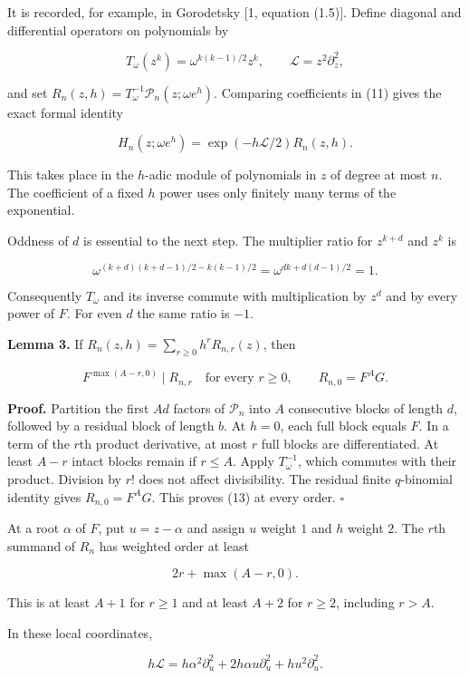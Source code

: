 \documentclass[
  11pt,
]{article}
\begin{document}
It is recorded, for example, in Gorodetsky {[}1, equation (1.5){]}.
Define diagonal and differential operators on polynomials by

\[
T_\omega(z^k)=\omega^{k(k-1)/2}z^k,
\qquad \mathcal L=z^2\partial_z^2,
\]

and set \(R_n(z,h)=T_\omega^{-1}\mathcal P_n(z;\omega e^h)\). Comparing
coefficients in (11) gives the exact formal identity

\[
H_n(z;\omega e^h)=\exp(-h\mathcal L/2)R_n(z,h). \tag{12}
\]

This takes place in the \(h\)-adic module of polynomials in \(z\) of
degree at most \(n\). The coefficient of a fixed \(h\) power uses only
finitely many terms of the exponential.

Oddness of \(d\) is essential to the next step. The multiplier ratio for
\(z^{k+d}\) and \(z^k\) is

\[
\omega^{(k+d)(k+d-1)/2-k(k-1)/2}
=\omega^{dk+d(d-1)/2}=1.
\]

Consequently \(T_\omega\) and its inverse commute with multiplication by
\(z^d\) and by every power of \(F\). For even \(d\) the same ratio is
\(-1\).

\textbf{Lemma 3.} If \(R_n(z,h)=\sum_{r\geq0}h^rR_{n,r}(z)\), then

\[
F^{\max(A-r,0)}\mid R_{n,r}\quad\text{for every }r\geq0,
\qquad R_{n,0}=F^AG. \tag{13}
\]

\textbf{Proof.} Partition the first \(Ad\) factors of \(\mathcal P_n\)
into \(A\) consecutive blocks of length \(d\), followed by a residual
block of length \(b\). At \(h=0\), each full block equals \(F\). In a
term of the \(r\)th product derivative, at most \(r\) full blocks are
differentiated. At least \(A-r\) intact blocks remain if \(r\leq A\).
Apply \(T_\omega^{-1}\), which commutes with their product. Division by
\(r!\) does not affect divisibility. The residual finite \(q\)-binomial
identity gives \(R_{n,0}=F^AG\). This proves (13) at every order.
\(\square\)

At a root \(\alpha\) of \(F\), put \(u=z-\alpha\) and assign \(u\)
weight \(1\) and \(h\) weight \(2\). The \(r\)th summand of \(R_n\) has
weighted order at least

\[
2r+\max(A-r,0). \tag{14}
\]

This is at least \(A+1\) for \(r\geq1\) and at least \(A+2\) for
\(r\geq2\), including \(r>A\).

In these local coordinates,

\[
h\mathcal L=h\alpha^2\partial_u^2
+2h\alpha u\partial_u^2+hu^2\partial_u^2. \tag{15}
\]
\end{document}
